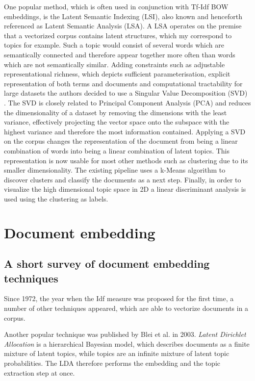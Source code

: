 One popular method, which is often used in conjunction with Tf-Idf BOW embeddings, is the Latent Semantic Indexing (LSI), also known and henceforth referenced as Latent Semantic Analysis (LSA). A LSA operates on the premise that a vectorized corpus contains latent structures, which my correspond to topics for example. Such a topic would consist of several words which are semantically connected and therefore appear together more often than words which are not semantically similar. Adding constraints such as adjustable representational richness, which depicts sufficient parameterisation, explicit representation of both terms and documents and computational tractability for large datasets the authors decided to use a Singular Value Decomposition (SVD) \cite{deerwesterIndexingLatentSemantic}. The SVD is closely related to Principal Component Analysis (PCA) and reduces the dimensionality of a dataset by removing the dimensions with the least variance, effectively projecting the vector space onto the subspace with the highest variance and therefore the most information contained. Applying a SVD on the corpus changes the representation of the document from being a linear combination of words into being a linear combination of latent topics. This representation is now usable for most other methods such as clustering due to its smaller dimensionality. The existing pipeline uses a k-Means algorithm to discover clusters and classify the documents as a next step. Finally, in order to visualize the high dimensional topic space in 2D a linear discriminant analysis is used using the clustering as labels.  


\section{Document embedding}

\subsection{A short survey of document embedding techniques}
Since 1972, the year when the Idf measure was proposed for the first time, \cite{robertsonUnderstandingInverseDocument2004} a number of other techniques appeared, which are able to vectorize documents in a corpus.

Another popular technique was published by Blei et al. \cite{bleiLatentDirichletAllocation2003} in 2003. \textit{Latent Dirichlet Allocation} is a hierarchical Bayesian model, which describes documents as a finite mixture of latent topics, while topics are an infinite mixture of latent topic probabilities. The LDA therefore performs the embedding and the topic extraction step at once.

